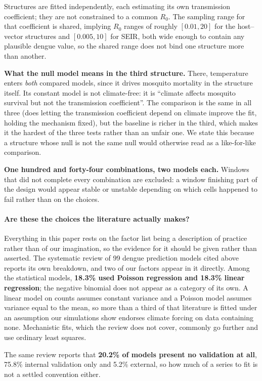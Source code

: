 \documentclass[11pt,a4paper]{article}
\begin{document}
Structures are fitted independently, each estimating its own transmission
coefficient; they are not constrained to a common $R_0$. The sampling range for
that coefficient is shared, implying $R_0$ ranges of roughly $[0.01, 20]$ for the
host--vector structures and $[0.005, 10]$ for SEIR, both wide enough to contain
any plausible dengue value, so the shared range does not bind one structure more
than another.

\textbf{What the null model means in the third structure.} There, temperature
enters \emph{both} compared models, since it drives mosquito mortality in the
structure itself. Its constant model is not climate-free: it is ``climate affects
mosquito survival but not the transmission coefficient''. The comparison is the
same in all three (does letting the transmission coefficient depend on climate
improve the fit, holding the mechanism fixed), but the baseline is richer in the
third, which makes it the hardest of the three tests rather than an unfair one.
We state this because a structure whose null is not the same null would otherwise
read as a like-for-like comparison.

\textbf{One hundred and forty-four combinations, two models each.} Windows that
did not complete every combination are excluded: a window finishing part of the
design would appear stable or unstable depending on which cells happened to fail
rather than on the choices.

\paragraph{Are these the choices the literature actually makes?} Everything in
this paper rests on the factor list being a description of practice rather than
of our imagination, so the evidence for it should be given rather than asserted.
The systematic review of 99 dengue prediction models cited
above~\cite{review2023} reports its own breakdown, and two of our factors appear
in it directly. Among the statistical models, \textbf{18.3\% used Poisson
regression and 18.3\% linear regression}; the negative binomial does not appear
as a category of its own. A linear model on counts assumes constant variance and
a Poisson model assumes variance equal to the mean, so more than a third of that
literature is fitted under an assumption our simulations show endorses climate
forcing on data containing none. Mechanistic fits, which the review does not
cover, commonly go further and use ordinary least squares.

The same review reports that \textbf{20.2\% of models present no validation at
all}, 75.8\% internal validation only and 5.2\% external, so how much of a
series to fit is not a settled convention either.
\end{document}
